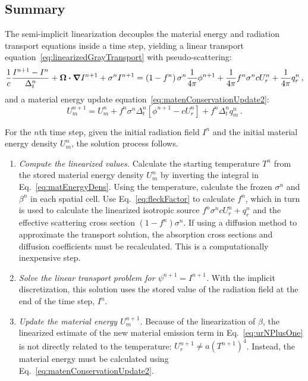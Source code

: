 \subsection{Summary}

The semi-implicit linearization decouples the material energy and radiation
transport equations inside a time step, yielding a linear transport
equation~\eqref{eq:linearizedGrayTransport} with pseudo-scattering:
\begin{equation*}
  \frac{1}{c} \frac{I^{n+1} - I^n}{\Delta_t^n}
  + \bm{\Omega} \bm{\cdot} \bm{\nabla} I^{n+1}
 + \sigma^n I^{n+1}
 =  \left(1 - f^n\right) \sigma^n \frac{1}{4\pi} \phi^{n+1}
 + \frac{1}{4\pi} f^n \sigma^n c U_r^n
  + \frac{1}{4\pi} q_r^n \,,
\end{equation*}
and a material energy update equation~\eqref{eq:matenConservationUpdate2}:
\begin{equation*}
  U_m^{n+1} = U_m^n + f^n \sigma^n \Delta_t^n
  \left[ \phi^{n+1} - c U_r^n \right] + f^n \Delta_t^n q_m^n \,.
\end{equation*}


For the $n$th time step, given the initial radiation field $I^{n}$ and the
initial material energy density $U_m^n$, the solution process follows.
\begin{enumerate}
  \item \emph{Compute the linearized values.}
    Calculate the starting temperature $T^n$
    from the stored material energy density $U_m^n$ by inverting the integral in
    Eq.~\eqref{eq:matEnergyDens}. Using the temperature,
    calculate
    the frozen $\sigma^n$ and $\beta^n$ in each spatial cell. Use
    Eq.~\eqref{eq:fleckFactor} to calculate $f^n$, which in turn is used to
    calculate the linearized isotropic source $f^n \sigma^n c U_r^n + q_r^n$
    and the effective scattering cross section $\left(1 - f^n\right) \sigma^n$.
    If using a diffusion method to approximate the transport solution, the
    absorption cross sections and diffusion coefficients must be recalculated.
    This is a computationally inexpensive step.

  \item \emph{Solve the linear transport problem for $\psi^{n+1}=I^{n+1}$.} With the
    implicit discretization, this solution uses the stored value of the radiation
    field at the end of the time step, $I^n$.
    
  \item \emph{Update the material energy $U_m^{n+1}$.}
    Because of the linearization of
    $\beta$, the linearized estimate of the new material emission term in
    Eq.~\eqref{eq:urNPlusOne} is not directly related to the temperature:
    $U_r^{n+1} \ne a (T^{n+1})^4$. Instead, the material energy must be calculated
    using Eq.~\eqref{eq:matenConservationUpdate2}.
\end{enumerate}

